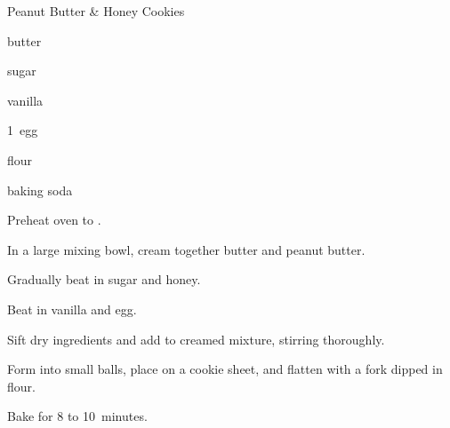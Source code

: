 \begin{recipe}{Peanut Butter \& Honey Cookies}{}{}

\begin{ingredients}
\item \C{\half} butter
\item \C{\third} 
\item \C{\half} sugar
\item \C{\third} 
\item {} vanilla
\item 1~egg
\item \C{1\half} flour
\item {} baking soda
\end{ingredients}

\begin{directions}
\item Preheat oven to .
\item In a large mixing bowl, cream together butter and peanut butter.
\item Gradually beat in sugar and honey.
\item Beat in vanilla and egg.
\item Sift dry ingredients and add to creamed mixture, stirring thoroughly.
\item Form into small balls, place on a cookie sheet, and flatten with a fork dipped in flour.
\item Bake for 8 to 10~minutes.
\end{directions}
\end{recipe}
